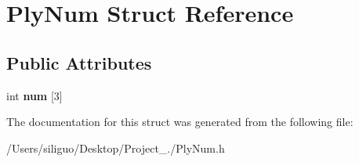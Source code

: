 \hypertarget{struct_ply_num}{}\section{Ply\+Num Struct Reference}
\label{struct_ply_num}
\subsection*{Public Attributes}
\begin{DoxyCompactItemize}
\item 
\hypertarget{struct_ply_num_a25556b4ba727ee27041741546631a468}{}\label{struct_ply_num_a25556b4ba727ee27041741546631a468} 
int {\bfseries num} \mbox{[}3\mbox{]}
\end{DoxyCompactItemize}


The documentation for this struct was generated from the following file\+:\begin{DoxyCompactItemize}
\item 
/\+Users/siliguo/\+Desktop/\+Project\+\_./Ply\+Num.\+h\end{DoxyCompactItemize}
